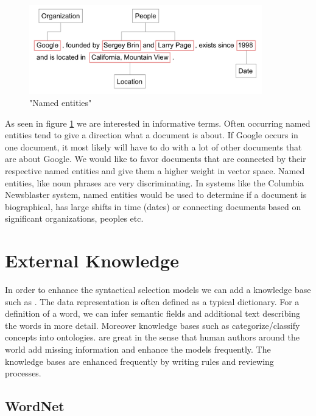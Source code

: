     \begin{figure}[h!]
      \centering
        \includegraphics[width=0.9\textwidth]{ner_tags.png}
        \caption{"Named entities"}
        \label{ner_tags}
    \end{figure} 

  As seen in figure \ref{ner_tags} we are interested in informative terms. Often occurring named entities tend to give a direction what a document is about. If Google occurs in one document, it most likely will have to do with a lot of other documents that are about Google. We would like to favor documents that are connected by their respective named entities and give them a higher weight in vector space. Named entities, like noun phrases are very discriminating. In systems like the Columbia Newsblaster system, named entities would be used to determine if a document is biographical, has large shifts in time (dates) or connecting documents based on significant organizations, peoples etc. \cite{ColumbiaMultiDoc2001}

\section{External Knowledge}
\label{sec:semantic_selection}

  In order to enhance the syntactical selection models we can add a knowledge base such as \wordwiki{}. The data representation is often defined as a typical dictionary. For a definition of a word, we can infer semantic fields and additional text describing the words in more detail. Moreover knowledge bases such as \wiki{} categorize/classify concepts into ontologies. \wordwiki{} are great in the sense that human authors around the world add missing information and enhance the models frequently. The knowledge bases are enhanced frequently by writing rules and reviewing processes.

  \subsection{WordNet}
  \label{sec:wordnet}

